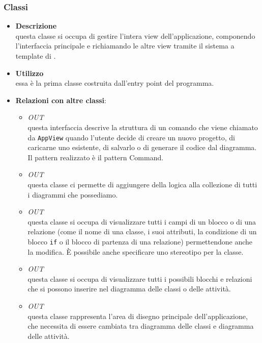 \subsubsection{Classi}
\label{\nogloxy{swedesigner::client::view::AppView}}
\begin{itemize}
\item \textbf{Descrizione}\\
questa classe si occupa di gestire l'intera view dell'applicazione, componendo l'interfaccia principale e richiamando le altre view tramite il sistema a template di \backbonejs{}.
\item \textbf{Utilizzo}\\
essa è la prima classe costruita dall'entry point del programma.
\item \textbf{Relazioni con altre classi}:
\begin{itemize}
\item \textit{OUT} \hyperref[\nogloxy{swedesigner::client::model::ProjectCommand}]{}\\
questa interfaccia descrive la struttura di un comando che viene chiamato da \texttt{AppView} quando l'utente decide di creare un nuovo progetto, di caricarne uno esistente, di salvarlo o di generare il codice dal diagramma. Il pattern realizzato è il pattern Command.
\item \textit{OUT} \hyperref[\nogloxy{swedesigner::client::model::ProjectModel}]{}\\
questa classe ci permette di aggiungere della logica alla collezione di tutti i diagrammi che possediamo.
\item \textit{OUT} \hyperref[\nogloxy{swedesigner::client::view::DetailsView}]{}\\
questa classe si occupa di visualizzare tutti i campi di un blocco o di una relazione (come il nome di una classe, i suoi attributi, la condizione di un blocco \texttt{if} o il blocco di partenza di una relazione) permettendone anche la modifica. È possibile anche specificare uno stereotipo per la classe.

\item \textit{OUT} \hyperref[\nogloxy{swedesigner::client::view::NewCellView}]{}\\
questa classe si occupa di visualizzare tutti i possibili blocchi e relazioni che si possono inserire nel diagramma delle classi o delle attività.
\item \textit{OUT} \hyperref[\nogloxy{swedesigner::client::view::ProjectView}]{}\\
questa classe rappresenta l'area di disegno principale dell'applicazione, che necessita di essere cambiata tra diagramma delle classi e diagramma delle attività. 
\end{itemize}
\end{itemize}

